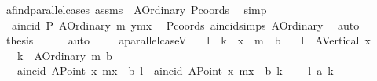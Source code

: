 \begin{isabellebody}
\ a{}find{\isacharunderscore}{\kern0pt}parallel{\isachardot}{\kern0pt}cases\ assms\ \ A{}Ordinary\ Pcoords\ \isamarkupfalse%
\ simp\ \isanewline
\ \ \ \ \isamarkupfalse%
\ {}{\isacharcolon}{\kern0pt}\ {\isachardoublequoteopen}a{}incid\ P\ {\isacharparenleft}{\kern0pt}A{}Ordinary\ m\ {\isacharparenleft}{\kern0pt}y{}{\isacharminus}{\kern0pt}m{\isacharasterisk}{\kern0pt}x{}{\isacharparenright}{\kern0pt}{\isacharparenright}{\kern0pt}{\isachardoublequoteclose}\ \isamarkupfalse%
\ Pcoords\ a{}incid{\isachardot}{\kern0pt}simps\ A{}Ordinary\ \isamarkupfalse%
\ auto\isanewline
\ \ \ \ \isamarkupfalse%
\ {\isacharquery}{\kern0pt}thesis\ \isamarkupfalse%
\ {}\ {}\ \isamarkupfalse%
\ auto\ \isanewline
\ \ \isamarkupfalse%
\isanewline
{}\isamarkupfalse%
%
\endisatagproof
{\isafoldproof}%
%
\isadelimproof
\isanewline
%
\endisadelimproof
\isanewline
{}\isamarkupfalse%
\ a{}parallel{\isacharunderscore}{\kern0pt}caseV{\isacharcolon}{\kern0pt}\isanewline
\ \ \ l\ \ k\ \ x{}\ \ m\ \ b\isanewline
\ \ \ {\isachardoublequoteopen}l\ {\isacharequal}{\kern0pt}\ A{}Vertical\ x{}{\isachardoublequoteclose}\isanewline
\ \ \ {\isachardoublequoteopen}k\ {\isacharequal}{\kern0pt}\ A{}Ordinary\ m\ b{\isachardoublequoteclose}\isanewline
\ \ \ {\isachardoublequoteopen}a{}incid\ {\isacharparenleft}{\kern0pt}A{}Point\ x{}\ {\isacharparenleft}{\kern0pt}m{\isacharasterisk}{\kern0pt}x{}\ {\isacharplus}{\kern0pt}\ b{\isacharparenright}{\kern0pt}{\isacharparenright}{\kern0pt}\ l{\isachardoublequoteclose}\ \ {\isachardoublequoteopen}a{}incid\ {\isacharparenleft}{\kern0pt}A{}Point\ x{}\ {\isacharparenleft}{\kern0pt}m{\isacharasterisk}{\kern0pt}x{}\ {\isacharplus}{\kern0pt}\ b{\isacharparenright}{\kern0pt}{\isacharparenright}{\kern0pt}\ k{\isachardoublequoteclose}\isanewline
\ \ \ {\isachardoublequoteopen}{\isasymnot}\ l\ a{}{\isacharbar}{\kern0pt}{\isacharbar}{\kern0pt}\ k{\isachardoublequoteclose}\isanewline
%
\isadelimproof

\end{isabellebody}
